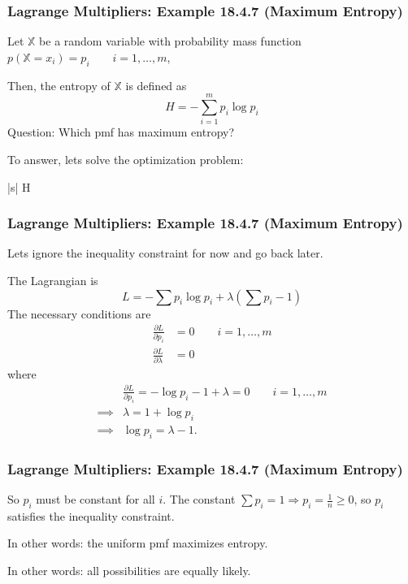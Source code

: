 \documentclass{beamer}
\begin{document}
\begin{frame}\frametitle{Lagrange Multipliers: Example 18.4.7 (Maximum Entropy)}
	Let $\mathbb{X}$ be a random variable with probability mass function $p(\mathbb{X}=x_i) = p_i \qquad i = 1, \ldots, m$,
	
	Then, the entropy of $\mathbb{X}$ is defined as
	\[ 
		H = -\sum_{i=1}^m p_i\log p_i 
	\]	
	Question:  Which pmf has maximum entropy?
	
	\vfill
	
	To answer, lets solve the optimization problem:
	\begin{maxi*}|s|
		{}{H}{}{}
	\end{maxi*}
\end{frame}

\begin{frame}\frametitle{Lagrange Multipliers: Example 18.4.7 (Maximum Entropy)}
	Lets ignore the inequality constraint for now and go back later.
	
	The Lagrangian is
	\[ 
		L = -\sum p_i \log p_i + \lambda(\sum p_i - 1) 
	\]
	The necessary conditions are
	\begin{align*}
		\frac{\partial L}{\partial p_i} &= 0 \qquad i = 1, \ldots, m\\
		\frac{\partial L}{\partial \lambda} &= 0
	\end{align*}
	where
	\begin{align*}
		& \frac{\partial L}{\partial p_i} = -\log p_i - 1 + \lambda = 0 \qquad i = 1, \ldots, m\\
		\implies & \lambda = 1+\log p_i\\
		\implies & \log p_i = \lambda - 1.
	\end{align*}	
\end{frame}

\begin{frame}\frametitle{Lagrange Multipliers: Example 18.4.7 (Maximum Entropy)}
	So $p_i$ must be constant for all $i$.  The constant $\sum p_i = 1 \Rightarrow p_i = \frac{1}{n} \geq 0$, so $p_i$ satisfies the inequality constraint.
	
	\vfill
	
	In other words: the uniform pmf maximizes entropy.
	
	\vfill
	
	In other words: all possibilities are equally likely.	
\end{frame}
\end{document}
